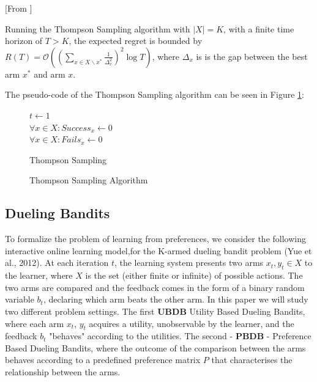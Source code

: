 \documentclass{llncs}
\begin{document}
	\begin{theorem}\label{thm:TS}[From \cite{...}]

		Running the Thompson Sampling algorithm with $|X|=K$, with a finite time horizon of $ T > K$, the expected regret is bounded by $R(T) = \mathcal{O} \left( \left(\sum_{x\in X \backslash x^*} \frac{1}{\Delta_x^2} \right)^2 \log T \right)$, where $\Delta_x$ is is the gap between the best arm $x^*$ and arm $x$.

	\end{theorem}	
	The pseudo-code of the Thompson Sampling algorithm can be seen in Figure \ref{algo_TS}:
	
	\begin{figure}[h]
	\IncMargin{1em}
		\begin{algorithm}[H]
		
			$ t\leftarrow 1$\\
			$\forall x \in X : Success_{x} \leftarrow 0$\\
			$\forall x \in X : Fails_{x} \leftarrow 0$\\			
			\BlankLine
			
			\caption{Thompson Sampling}
		\end{algorithm}
		\caption{Thompson Sampling Algorithm}\label{algo_TS}
	\end{figure}	
	
	\subsection{Dueling Bandits}
		To formalize the problem of learning from preferences, we consider the following interactive online learning model,for the K-armed dueling bandit problem (Yue et al., 2012).
		At each iteration $t$, the learning system presents two arms $x_t, y_t \in X$ to the learner, where $X$ is the set (either finite or infinite) of possible actions. The two arms are compared and the feedback comes in the form of a binary random variable $b_t$, declaring which arm beats the other arm.
		In this paper we will study two different problem settings.
		The first \textbf{UBDB} Utility Based Dueling Bandits, where each arm $x_t$, $y_t$ acquires a utility, unobservable by the learner, and the feedback $b_t$ "behaves" according to the utilities. 
		The second - \textbf{PBDB} - Preference Based Dueling Bandits, where the outcome of the comparison between the arms behaves according to a predefined preference matrix $P$ that characterises the relationship between the arms.
\end{document}
